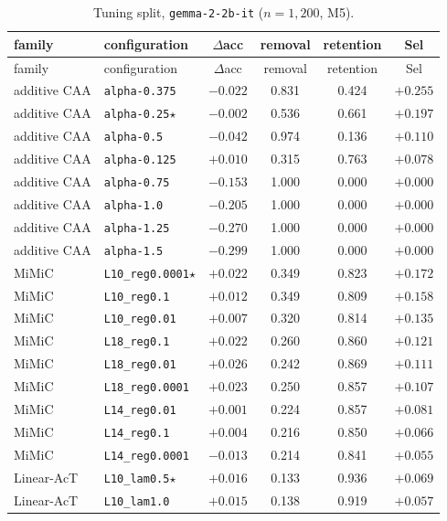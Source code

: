 {\scriptsize\setlength{\tabcolsep}{3pt}
\begin{longtable}{l|l|c|cc|c}
\caption{Tuning split, \texttt{gemma-2-2b-it} ($n=1{,}200$, M5).}\label{tab:tune-gemma}\\
\hline
family & configuration & $\Delta$acc & removal & retention & Sel \\
\hline
\endfirsthead
\hline
family & configuration & $\Delta$acc & removal & retention & Sel \\
\hline
\endhead
additive CAA & \texttt{alpha-0.375} & $-0.022$ & 0.831 & 0.424 & $+0.255$ \\
additive CAA & \texttt{alpha-0.25}$\star$ & $-0.002$ & 0.536 & 0.661 & $+0.197$ \\
additive CAA & \texttt{alpha-0.5} & $-0.042$ & 0.974 & 0.136 & $+0.110$ \\
additive CAA & \texttt{alpha-0.125} & $+0.010$ & 0.315 & 0.763 & $+0.078$ \\
additive CAA & \texttt{alpha-0.75} & $-0.153$ & 1.000 & 0.000 & $+0.000$ \\
additive CAA & \texttt{alpha-1.0} & $-0.205$ & 1.000 & 0.000 & $+0.000$ \\
additive CAA & \texttt{alpha-1.25} & $-0.270$ & 1.000 & 0.000 & $+0.000$ \\
additive CAA & \texttt{alpha-1.5} & $-0.299$ & 1.000 & 0.000 & $+0.000$ \\
MiMiC & \texttt{L10\_reg0.0001}$\star$ & $+0.022$ & 0.349 & 0.823 & $+0.172$ \\
MiMiC & \texttt{L10\_reg0.1} & $+0.012$ & 0.349 & 0.809 & $+0.158$ \\
MiMiC & \texttt{L10\_reg0.01} & $+0.007$ & 0.320 & 0.814 & $+0.135$ \\
MiMiC & \texttt{L18\_reg0.1} & $+0.022$ & 0.260 & 0.860 & $+0.121$ \\
MiMiC & \texttt{L18\_reg0.01} & $+0.026$ & 0.242 & 0.869 & $+0.111$ \\
MiMiC & \texttt{L18\_reg0.0001} & $+0.023$ & 0.250 & 0.857 & $+0.107$ \\
MiMiC & \texttt{L14\_reg0.01} & $+0.001$ & 0.224 & 0.857 & $+0.081$ \\
MiMiC & \texttt{L14\_reg0.1} & $+0.004$ & 0.216 & 0.850 & $+0.066$ \\
MiMiC & \texttt{L14\_reg0.0001} & $-0.013$ & 0.214 & 0.841 & $+0.055$ \\
Linear-AcT & \texttt{L10\_lam0.5}$\star$ & $+0.016$ & 0.133 & 0.936 & $+0.069$ \\
Linear-AcT & \texttt{L10\_lam1.0} & $+0.015$ & 0.138 & 0.919 & $+0.057$ \\

\end{longtable}}
